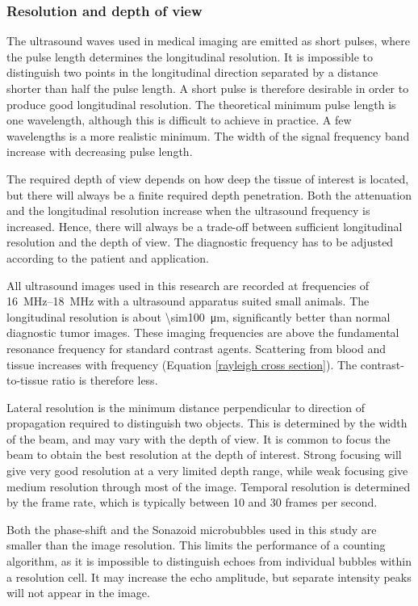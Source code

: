 \clearpage
\subsubsection{Resolution and depth of view}
The ultrasound waves used in medical imaging are emitted as short pulses, where the pulse length determines the longitudinal resolution. It is impossible to distinguish two points in the longitudinal direction separated by a distance shorter than half the pulse length. A short pulse is therefore desirable in order to produce good longitudinal resolution. The theoretical minimum pulse length is one wavelength, although this is difficult to achieve in practice. A few wavelengths is a more realistic minimum. The width of the signal frequency band increase with decreasing pulse length. 

The required depth of view depends on how deep the tissue of interest is located, but there will always be a finite required depth penetration. Both the attenuation and the longitudinal resolution increase when the ultrasound frequency is increased. Hence, there will always be a trade-off between sufficient longitudinal resolution and the depth of view. The diagnostic frequency has to be adjusted according to the patient and application. 

All ultrasound images used in this research are recorded at frequencies of \SIrange{16}{18}{\mega\hertz} with a ultrasound apparatus suited small animals. The longitudinal resolution is about \SI{\sim100}{\micro\meter}, significantly better than normal diagnostic tumor images. These imaging frequencies are above the fundamental resonance frequency for standard contrast agents. Scattering from blood and tissue increases with frequency (Equation \eqref{rayleigh cross section}). The contrast-to-tissue ratio is therefore less. 

Lateral resolution is the minimum distance perpendicular to direction of propagation required to distinguish two objects. This is determined by the width of the beam, and may vary with the depth of view. It is common to focus the beam to obtain the best resolution at the depth of interest. Strong focusing will give very good resolution at a very limited depth range, while weak focusing give medium resolution through most of the image. Temporal resolution is determined by the frame rate, which is typically between 10 and 30 frames per second. 

Both the phase-shift and the Sonazoid\texttrademark{} microbubbles used in this study are smaller than the image resolution. This limits the performance of a counting algorithm, as it is impossible to distinguish echoes from individual bubbles within a resolution cell. It may increase the echo amplitude, but separate intensity peaks will not appear in the image.


